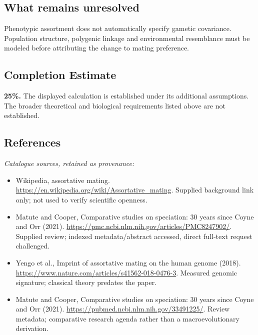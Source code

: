 \documentclass[11pt]{article}
\begin{document}
\subsection{What remains unresolved}
Phenotypic assortment does not automatically specify gametic covariance. Population structure, polygenic linkage and environmental resemblance must be modeled before attributing the change to mating preference.
\subsection{Completion Estimate}
\textbf{25\%.} The displayed calculation is established under its additional assumptions. The broader theoretical and biological requirements listed above are not established.
\subsection{References}
\noindent\emph{Catalogue sources, retained as provenance:}
\begin{itemize}
\item Wikipedia, assortative mating. \url{https://en.wikipedia.org/wiki/Assortative_mating}. Supplied background link only; not used to verify scientific openness.
\item Matute and Cooper, Comparative studies on speciation: 30 years since Coyne and Orr (2021). \url{https://pmc.ncbi.nlm.nih.gov/articles/PMC8247902/}. Supplied review; indexed metadata/abstract accessed, direct full-text request challenged.
\item Yengo et al., Imprint of assortative mating on the human genome (2018). \url{https://www.nature.com/articles/s41562-018-0476-3}. Measured genomic signature; classical theory predates the paper.
\item Matute and Cooper, Comparative studies on speciation: 30 years since Coyne and Orr (2021). \url{https://pubmed.ncbi.nlm.nih.gov/33491225/}. Review metadata; comparative research agenda rather than a macroevolutionary derivation.
\end{itemize}
\clearpage


\appendix
\end{document}
